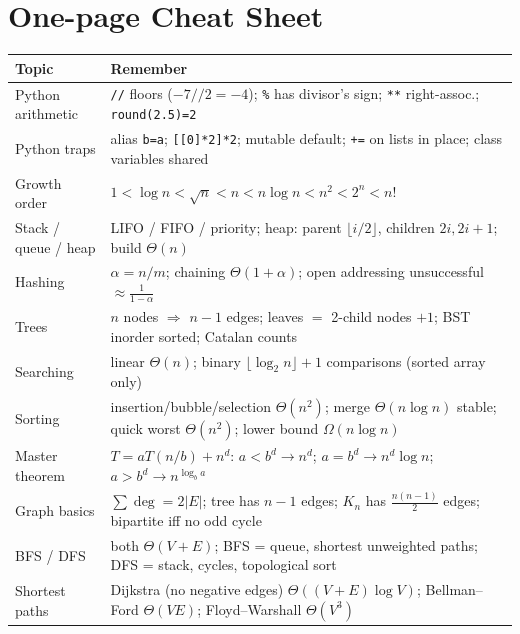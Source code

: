 \documentclass[11pt,a4paper]{article}
\newcommand{\py}[1]{\texttt{#1}}
\begin{document}
\section{One-page Cheat Sheet}
\small
\begin{center}
\begin{tabularx}{\textwidth}{>{\raggedright\arraybackslash}p{3.1cm} >{\raggedright\arraybackslash}X}
\toprule
\textbf{Topic} & \textbf{Remember}\\
\midrule
Python arithmetic & \py{//} floors ($-7//2=-4$); \py{\%} has divisor's sign; \py{**} right-assoc.; \py{round(2.5)=2}\\
Python traps & alias \py{b=a}; \py{[[0]*2]*2}; mutable default; \py{+=} on lists in place; class variables shared\\
Growth order & $1<\log n<\sqrt n<n<n\log n<n^2<2^n<n!$\\
Stack / queue / heap & LIFO / FIFO / priority; heap: parent $\lfloor i/2\rfloor$, children $2i,2i+1$; build $\Theta(n)$\\
Hashing & $\alpha=n/m$; chaining $\Theta(1+\alpha)$; open addressing unsuccessful $\approx\frac1{1-\alpha}$\\
Trees & $n$ nodes $\Rightarrow$ $n-1$ edges; leaves $=$ 2-child nodes $+1$; BST inorder sorted; Catalan counts\\
Searching & linear $\Theta(n)$; binary $\lfloor\log_2n\rfloor+1$ comparisons (sorted array only)\\
Sorting & insertion/bubble/selection $\Theta(n^2)$; merge $\Theta(n\log n)$ stable; quick worst $\Theta(n^2)$; lower bound $\Omega(n\log n)$\\
Master theorem & $T=aT(n/b)+n^d$: $a<b^d\to n^d$; $a=b^d\to n^d\log n$; $a>b^d\to n^{\log_ba}$\\
Graph basics & $\sum\deg=2|E|$; tree has $n-1$ edges; $K_n$ has $\frac{n(n-1)}2$ edges; bipartite iff no odd cycle\\
BFS / DFS & both $\Theta(V+E)$; BFS = queue, shortest unweighted paths; DFS = stack, cycles, topological sort\\
Shortest paths & Dijkstra (no negative edges) $\Theta((V+E)\log V)$; Bellman--Ford $\Theta(VE)$; Floyd--Warshall $\Theta(V^3)$\\
\bottomrule
\end{tabularx}
\end{center}
\normalsize

\end{document}
